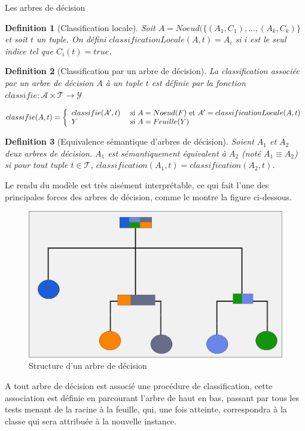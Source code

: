 \documentclass[a4paper, 11pt]{report}
\newtheorem{definition}{Definition}
\newcommand{\tupleset}{\ensuremath{\mathcal{T}}}
\newcommand{\arbreset}{\ensuremath{\mathcal{A}}}
\newcommand{\classeset}{\ensuremath{\mathcal{Y}}}
\begin{document}
\begin{chapter}{Les arbres de décision}
\begin{definition}[Classification locale]
  Soit $A=Noeud(\{(A_1,C_1),\dots,(A_k,C_k)\}$ et soit $t$ un tuple.
  On défini $classificationLocale(A,t)=A_i$ si $i$ est le seul indice tel que $C_i(t)=true$.
\end{definition}


\begin{definition}[Classification par un arbre de décision]
  La classification associée par un arbre de décision $A$ à un tuple $t$ est définie par la fonction $classifie:\arbreset\times\tupleset\rightarrow\classeset$

  $$classifie(A,t)=\left\{
    \begin{array}[c]{ll}
      classifie(A',t)&\textnormal{ si }A=Noeud(F)\textnormal{ et }A' = classificationLocale(A,t)\\
      Y&\textnormal{ si }A=Feuille(Y)
    \end{array}
  \right.
  $$
\end{definition}

\begin{definition}[Equivalence sémantique d'arbres de décision]
  Soient $A_1$ et $A_2$ deux arbres de décision. $A_1$ est sémantiquement équivalent à $A_2$ (noté $A_1\equiv A_2$) si pour tout tuple $t\in\tupleset$, $classification(A_1,t) = classification(A_2,t)$.
\end{definition}

Le rendu du modèle est très aisément interprétable, ce qui fait l'une des principales forces des arbres de décision, comme le montre la figure ci-dessous.

\begin{figure}[!h]
\begin{center}
	\includegraphics[scale=2]{Images/arbreD.png}
	\caption{Structure d'un arbre de décision}
\end{center}
\label{Arbre}
\end{figure}
A tout arbre de décision est associé une procédure de classification, cette association est définie en parcourant l'arbre de haut en bas, passant par tous les tests menant de la racine à la feuille, qui, une fois atteinte, correspondra à la classe qui sera attribuée à la nouvelle instance.



\end{chapter}
\end{document}
